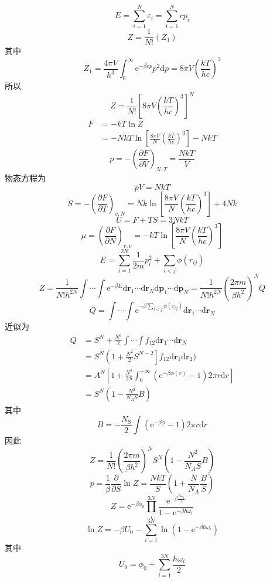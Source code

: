 \documentclass[UTF8,9pt]{ctexart}
\begin{document}
 $$ 
 E=\sum_{i=1}^{N} \varepsilon_{i}=\sum_{i=1}^{N} c p_{i}
  $$
  $$Z 
=\frac{1}{N !}\left(Z_{1}\right)
 $$
 其中$$ 
 Z_{1}=\frac{4 \pi V}{h^{3}} \int_{0}^{\infty} \mathrm{e}^{-\beta \varepsilon p} p^{2} \mathrm{d} p=8 \pi V\left(\frac{k T}{h c}\right)^{3}
  $$所以$$ 
  Z=\frac{1}{N !}\left[8 \pi V\left(\frac{k T}{h c}\right)^{3}\right]^{N}
   $$
   $$ 
\begin{aligned} F &=-k T \ln Z \\ &=-N k T \ln \left[\frac{8 \pi V}{N}\left(\frac{k T}{h c}\right)^{3}\right]-N k T \end{aligned}
 $$$$ 
 p=-\left(\frac{\partial F}{\partial V}\right)_{N, T}=\frac{N k T}{V}
  $$物态方程为
  $$ 
p V=N k T
 $$
 $$ 
S=-\left(\frac{\partial F}{\partial T}\right)_{v, N}=N k \ln \left[\frac{8 \pi V}{N}\left(\frac{k T}{h c}\right)^{3}\right]+4 N k
 $$$$ 
 U=F+T S=3 N k T
  $$$$ 
  \mu=\left(\frac{\partial F}{\partial N}\right)_{r, v}=-k T \ln \left[\frac{8 \pi V}{N}\left(\frac{k T}{h c}\right)^{3}\right]
   $$
   $$ 
E=\sum_{i=1}^{2 N} \frac{1}{2 m} p_{i}^{2}+\sum_{i<j} \phi\left(r_{i j}\right)
 $$$$ 
 Z=\frac{1}{N ! h^{2 N}} \int \cdots \int \mathrm{e}^{-\beta E} \mathrm{d} \boldsymbol{r}_{1} \cdots \mathrm{d} \boldsymbol{r}_{N} \mathrm{d} \boldsymbol{p}_{1} \cdots \mathrm{d} \boldsymbol{p}_{N}
  =\frac{1}{N ! h^{2 N}}\left(\frac{2 \pi m}{\beta h^{2}}\right)^{N} Q
   $$
   $$ 
Q=\int \cdots \int \mathrm{e}^{-\beta \sum_{i<j} \phi\left(r_{i j}\right)} \mathrm{d} \boldsymbol{r}_{1} \cdots \mathrm{d} \boldsymbol{r}_{N}
 $$
 近似为
 $$ 
\begin{aligned} Q &=S^{N}+\frac{N^{2}}{2} \int \cdots \int f_{12} \mathrm{d} \boldsymbol{r}_{1} \cdots \mathrm{d} \boldsymbol{r}_{N} \\ &=S^{N}\left(1+\frac{N^{2}}{2} S^{N-2}\right] f_{12} \mathrm{d} \boldsymbol{r}_{1} \mathrm{d} \boldsymbol{r}_{2} ) \\ &=A^{N}\left[1+\frac{N^{2}}{2 S} \int_{0}^{+\infty}\left(\mathrm{e}^{-\beta \phi(r)}-1\right) 2 \pi r \mathrm{d} r\right] \\ &=S^{N}\left(1-\frac{N^{2}}{N_{A} S} B\right) \end{aligned}
 $$其中$$ 
 B=-\frac{N_{\mathrm{S}}}{2} \int\left(\mathrm{e}^{-\beta \phi}-1\right) 2 \pi r \mathrm{d} r
  $$
  因此
  $$ 
Z=\frac{1}{N !}\left(\frac{2 \pi m}{\beta h^{2}}\right)^{N} S^{N}\left(1-\frac{N^{2}}{N_{A} S} B\right)
 $$
 $$ 
p=\frac{1}{\beta} \frac{\partial}{\partial S} \ln Z=\frac{N k T}{S}\left(1+\frac{N}{N_{A}} \frac{B}{S}\right)
 $$
 \qqed
 $$ 
Z=\mathrm{e}^{-\beta \phi_{0}} \prod_{i}^{3 N} \frac{\mathrm{e}^{-\beta \frac{\hbar \omega_{i}}{2}}}{1-\mathrm{e}^{-\beta \hbar \omega_{i}}}
 $$$$ 
 \ln Z=-\beta U_{0}-\sum_{i=1}^{3 N} \ln \left(1-\mathrm{e}^{-\beta \hbar \omega_{i}}\right)
  $$其中$$ 
  U_{0}=\phi_{0}+\sum_{i=1}^{3 N} \frac{\hbar \omega_{i}}{2}
   $$
\end{document}
